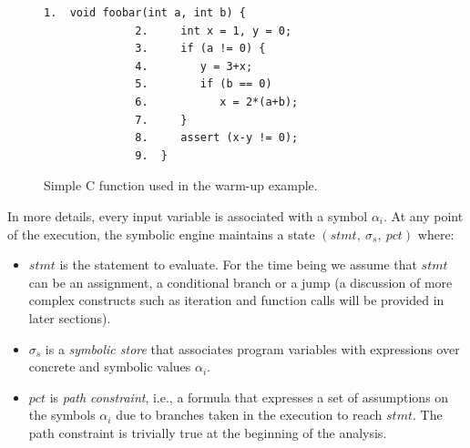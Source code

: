 \begin{figure}[t]
\begin{lstlisting}[basicstyle=\ttfamily\small]
              1.  void foobar(int a, int b) {
              2.     int x = 1, y = 0;
              3.     if (a != 0) {
              4.        y = 3+x;
              5.        if (b == 0)
              6.           x = 2*(a+b);
              7.     }
              8.     assert (x-y != 0);
              9.  }
\end{lstlisting}
\caption{Simple C function used in the warm-up example.}
\label{fig:example-1}
\end{figure}

In more details, every input variable is associated with a symbol $\alpha_i$.  At any point of the execution, the symbolic engine maintains a state $(stmt,~\sigma_s,~pct)$ where:

\begin{itemize}

\item $stmt$ is the statement to evaluate. For the time being we assume that $stmt$ can be an assignment, a conditional branch or a jump (a discussion of more complex constructs such as iteration and function calls will be provided in later sections).

\item $\sigma_s$ is a {\em symbolic store} that associates program variables with expressions over concrete and symbolic values $\alpha_i$.

  \item $pct$ is {\em path constraint}, i.e., a formula that expresses a set of assumptions on the symbols $\alpha_i$ due to branches taken in the execution to reach $stmt$. The path constraint is trivially true at the beginning of the analysis.

\end{itemize}

